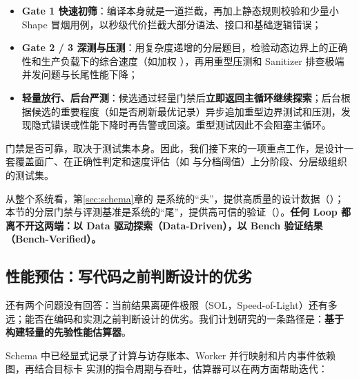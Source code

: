 \begin{itemize}
\item
\textbf{Gate 1 快速初筛}：编译本身就是一道拦截，再加上静态规则校验和少量小 Shape 冒烟用例，以秒级代价拦截大部分语法、接口和基础逻辑错误；


\item
\textbf{Gate 2 / 3 深测与压测}：用复杂度递增的分层题目，检验动态边界上的正确性和生产负载下的综合速度（如加权 ），再用重型压测和 Sanitizer 排查极端并发问题与长尾性能下降；


\item
\textbf{轻量放行、后台严测}：候选通过轻量门禁后\textbf{立即返回主循环继续探索}；后台根据候选的重要程度（如是否刷新最优记录）异步追加重型边界测试和压测，发现隐式错误或性能下降时再告警或回滚。重型测试因此不会阻塞主循环。


\end{itemize}

\begin{DiagramBlock}
\end{DiagramBlock}
门禁是否可靠，取决于测试集本身。因此，我们接下来的一项重点工作，是设计一套覆盖面广、在正确性判定和速度评估（如  与分档阈值）上分阶段、分层级组织的测试集。


从整个系统看，第\ref{sec:schema}章的  是系统的“头”，提供高质量的设计数据（）；本节的分层门禁与评测基准是系统的“尾”，提供高可信的验证（）。\textbf{任何 Loop 都离不开这两端：以 Data 驱动探索（Data-Driven），以 Bench 验证结果（Bench-Verified）。}


\SourceSeparator
\subsection{性能预估：写代码之前判断设计的优劣}\label{sec:perf-prediction}
还有两个问题没有回答：当前结果离硬件极限（SOL，Speed-of-Light）还有多远；能否在编码和实测之前判断设计的优劣。我们计划研究的一条路径是：\textbf{基于}  \textbf{构建轻量的先验性能估算器}。


\begin{DiagramBlock}
\end{DiagramBlock}
Schema 中已经显式记录了计算与访存账本、Worker 并行映射和片内事件依赖图，再结合目标卡  实测的指令周期与吞吐，估算器可以在两方面帮助迭代：



